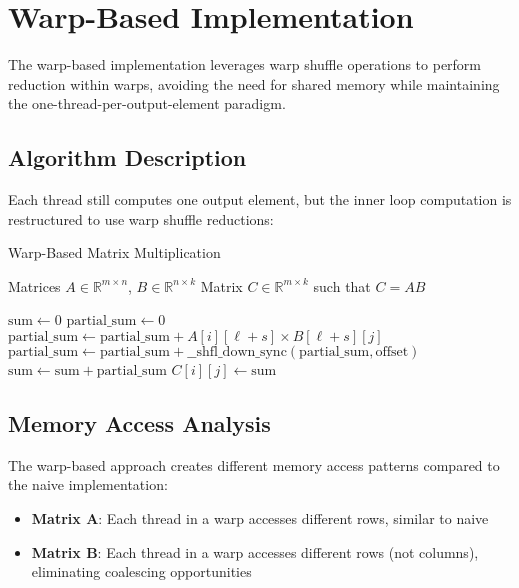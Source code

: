\documentclass{amsbook}
\theoremstyle{definition}
\begin{document}
\section{Warp-Based Implementation}

The warp-based implementation leverages warp shuffle operations to perform reduction within warps, avoiding the need for shared memory while maintaining the one-thread-per-output-element paradigm.

\subsection{Algorithm Description}

Each thread still computes one output element, but the inner loop computation is restructured to use warp shuffle reductions:

\begin{algorithm}
\caption{Warp-Based Matrix Multiplication}
\begin{algorithmic}[1]
\Require Matrices $A \in \mathbb{R}^{m \times n}$, $B \in \mathbb{R}^{n \times k}$
\Ensure Matrix $C \in \mathbb{R}^{m \times k}$ such that $C = AB$

    \State $\text{sum} \leftarrow 0$
        \State $\text{partial\_sum} \leftarrow 0$
            \State $\text{partial\_sum} \leftarrow \text{partial\_sum} + A[i][\ell+s] \times B[\ell+s][j]$
        \EndFor
            \State $\text{partial\_sum} \leftarrow \text{partial\_sum} + \text{\_\_shfl\_down\_sync}(\text{partial\_sum}, \text{offset})$
        \EndFor
            \State $\text{sum} \leftarrow \text{sum} + \text{partial\_sum}$
        \EndIf
    \EndFor
    \State $C[i][j] \leftarrow \text{sum}$
\EndFor
\end{algorithmic}
\end{algorithm}

\subsection{Memory Access Analysis}

The warp-based approach creates different memory access patterns compared to the naive implementation:

\begin{itemize}
\item \textbf{Matrix A}: Each thread in a warp accesses different rows, similar to naive
\item \textbf{Matrix B}: Each thread in a warp accesses different rows (not columns), eliminating coalescing opportunities
\end{itemize}
\end{document}

